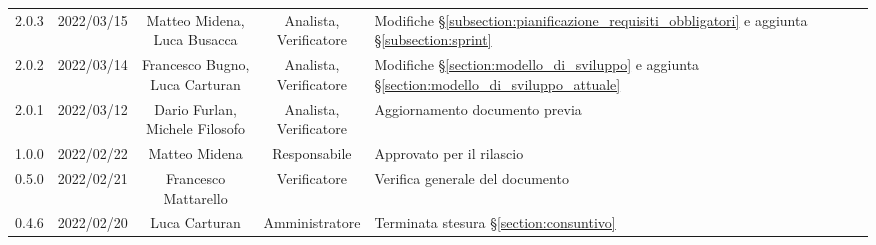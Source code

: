 \begin{center}
\begin{longtable}[c]{c | c | c | c | p{5cm}}
		2.0.3                                                      & 2022/03/15 & \Shortunderstack{Matteo Midena,                                                                                                                                                                     \\Luca Busacca} & \Shortunderstack{Analista,\\Verificatore} & Modifiche §\ref{subsection:pianificazione_requisiti_obbligatori} e aggiunta §\ref{subsection:sprint}\\
		2.0.2                                                      & 2022/03/14 & \Shortunderstack{Francesco Bugno,                                                                                                                                                                   \\Luca Carturan} & \Shortunderstack{Analista,\\Verificatore} & Modifiche §\ref{section:modello_di_sviluppo} e aggiunta §\ref{section:modello_di_sviluppo_attuale}\\
		2.0.1                                                      & 2022/03/12 & \Shortunderstack{Dario Furlan,                                                                                                                                                                      \\Michele Filosofo} & \Shortunderstack{Analista,\\Verificatore} & Aggiornamento documento previa \RTB{} \\
		1.0.0                                                      & 2022/02/22 & Matteo Midena                          & Responsabile   & Approvato per il rilascio                                                                                                                 \\
		0.5.0                                                      & 2022/02/21 & Francesco Mattarello                   & Verificatore   & Verifica generale del documento                                                                                                           \\
		0.4.6                                                      & 2022/02/20 & Luca Carturan                          & Amministratore & Terminata stesura §\ref{section:consuntivo}                                                                                               \\

\end{longtable}
\end{center}
